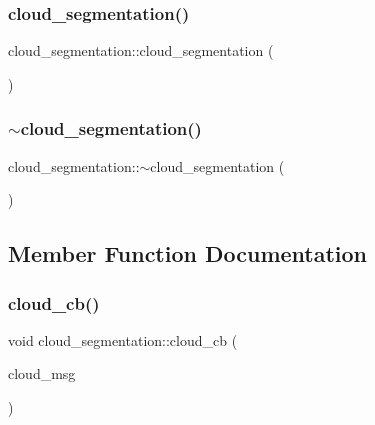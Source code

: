 \subsubsection{\texorpdfstring{cloud\+\_\+segmentation()}{cloud\_segmentation()}}
{\footnotesize\ttfamily cloud\+\_\+segmentation\+::cloud\+\_\+segmentation (\begin{DoxyParamCaption}{ }\end{DoxyParamCaption})}

\mbox{\label{classdatmo_1_1cloud__segmentation_a493c03c6c372488ed9b507b296af2ed4}} 
\subsubsection{\texorpdfstring{$\sim$cloud\+\_\+segmentation()}{~cloud\_segmentation()}}
{\footnotesize\ttfamily cloud\+\_\+segmentation\+::$\sim$cloud\+\_\+segmentation (\begin{DoxyParamCaption}{ }\end{DoxyParamCaption})}



\subsection{Member Function Documentation}
\mbox{\label{classdatmo_1_1cloud__segmentation_a9fb8b8321055b7798ce62d1cd9416642}} 
\subsubsection{\texorpdfstring{cloud\+\_\+cb()}{cloud\_cb()}}
{\footnotesize\ttfamily void cloud\+\_\+segmentation\+::cloud\+\_\+cb (\begin{DoxyParamCaption}\item[{const sensor\+\_\+msgs\+::\+Point\+Cloud2\+Const\+Ptr \&}]{cloud\+\_\+msg }\end{DoxyParamCaption})\hspace{0.3cm}{\ttfamily [private]}}


